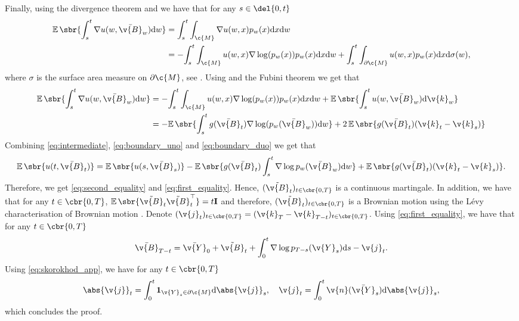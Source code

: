 Finally, using the divergence theorem and \textcite[Theorem 2.6]{burdzy2004heat} we have that for any \(s \in \del{0,t}\) \begin{align} {\E\sbr{\int_s^t \nabla u(w, \bar{\v{B}}_w) \mathrm{d} w }} & = {\int_s^t \int_\c{M} \nabla u(w, x) p_w(x) \mathrm{d} x \mathrm{d} w } \\ & = - {\int_s^t \int_\c{M} u(w, x) \nabla \log (p_w(x)) p_w(x) \mathrm{d} x \mathrm{d} w + \int_s^t \int_{\partial \c{M}} u(w,x) p_w(x) \mathrm{d} x \mathrm{d} \sigma(w)} , \end{align} where \(\sigma\) is the surface area measure on \(\partial \c{M}\), see \textcite{burdzy2004heat}.
Using  and the Fubini theorem we get that \begin{align} {\E\sbr{\int_s^t \nabla u(w, \bar{\v{B}}_w) \mathrm{d} w }} & = - {\int_s^t \int_\c{M} u(w, x) \nabla \log (p_w(x)) p_w(x) \mathrm{d} x \mathrm{d} w + \E\sbr{\int_s^t u(w, \bar{\v{B}}_w) \mathrm{d} \v{k}_w } } \\ & = - {\E\sbr{\int_s^t g(\bar{\v{B}}_t) \nabla \log (p_w(\bar{\v{B}}_w))\mathrm{d} w} + 2 \E\sbr{g(\bar{\v{B}}_t)(\v{k}_t - \v{k}_s) }} \label{eq:boundary_duo} \end{align} Combining \eqref{eq:intermediate}, \eqref{eq:boundary_uno} and \eqref{eq:boundary_duo} we get that \begin{equation} { \E\sbr{u(t, \bar{\v{B}}_t) } = \E\sbr{u(s, \bar{\v{B}}_s) } - \E\sbr{ g(\bar{\v{B}}_t)\int_s^t \nabla \log p_w(\bar{\v{B}}_w) \mathrm{d} w }} + { \E\sbr{g(\bar{\v{B}}_t)(\v{k}_t - \v{k}_s) }} .
\end{equation}
Therefore, we get \eqref{eq:second_equality} and \eqref{eq:first_equality}.
Hence, \((\tilde{\v{B}}_t)_{t \in \cbr{0,T}}\) is a continuous martingale.
In addition, we have that for any \(t \in \cbr{0,T}\), \(\E\sbr{\tilde{\v{B}}_t \tilde{\v{B}}_t^\top} = t \m{I}\) and therefore, \((\tilde{\v{B}}_t)_{t \in \cbr{0,T}}\) is a Brownian motion using the L\'evy characterisation of Brownian motion \parencite[Chapter IV, Theorem 3.6]{revuz2013continuous}.
Denote \((\v{j}_t)_{t \in \cbr{0,T}} = (\v{k}_T - \v{k}_{T-t})_{t \in \cbr{0,T}}\).
Using \eqref{eq:first_equality}, we have that for any \(t \in \cbr{0,T}\) \begin{equation} {\bar{\v{B}}_{T-t} = \bar{\v{Y}}_0 + \tilde{\v{B}}_t + \int_0^t \nabla \log p_{T-s}(\v{Y}_s) \mathrm{d} s - \v{j}_t .
	}
\end{equation}
Using \eqref{eq:skorokhod_app}, we have for any \(t \in \cbr{0,T}\) \begin{equation} {\abs{\v{j}}_t = \int_0^t \mathbf{1}_{\v{Y}_s \in \partial \c{M}} \mathrm{d} \abs{\v{j}}_s , \quad \v{j}_t = \int_0^t \v{n}(\bar{\v{Y}}_s) \mathrm{d} \abs{\v{j}}_s ,} \end{equation} which concludes the proof.
